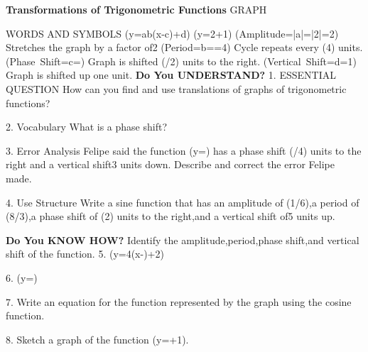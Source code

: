 \documentclass{article}
\newenvironment{concept-summary}{}{}    %
\newcommand{\answer}[1]{}               %
\newcommand{\placeholder}[2]{}          %
\begin{document}
\begin{concept-summary}
\textbf{Transformations of Trigonometric Functions}
GRAPH
\placeholder{graph}{Red y=sin x and blue y=2sin[(1/2)(x-pi/2)]+1,arrowed x,y axes,O; x ticks pi/2,labels-2pi,-pi,pi,2pi; y ticks1,labels-2,2,window-3pi..3pi,-4..4. Blue maxima(-5pi/2,3),(3pi/2,3),minimum(-pi/2,-1), red amplitude1 period2pi;curves end arrows,equation labels colored.}
WORDS AND SYMBOLS
(y=a\sin b(x-c)+d)
(y=2+1)
(Amplitude=|a|=|2|=2)
Stretches the graph by a factor of2
(Period=\frac{2\pi}b==4\pi)
Cycle repeats every (4\pi) units.
(Phase\ Shift=c=\frac{})
Graph is shifted (\pi/2) units to the right.
(Vertical\ Shift=d=1)
Graph is shifted up one unit.
\textbf{Do You UNDERSTAND?}
1. ESSENTIAL QUESTION How can you find and use translations of graphs of trigonometric functions?
\answer{You can analyze the graphs of sine and cosine functions to find changes in amplitude,period,phase shift,and vertical shift.}
2. Vocabulary What is a phase shift?
\answer{A phase shift is a horizontal translation of a periodic function.}
3. Error Analysis Felipe said the function (y=) has a phase shift (\pi/4) units to the right and a vertical shift3 units down. Describe and correct the error Felipe made.
\answer{The value of c in the function is negative,which means the phase shift is to the left,not to the right. The phase shift is left(pi/4) units.}
4. Use Structure Write a sine function that has an amplitude of (1/6),a period of (8\pi/3),a phase shift of (2\pi) units to the right,and a vertical shift of5 units up.
\answer{(y=\frac16\sin[\frac34(x-2\pi)]+5)}
\textbf{Do You KNOW HOW?}
Identify the amplitude,period,phase shift,and vertical shift of the function.
5. (y=4\sin(x-\frac{})+2)
\answer{amplitude:4;period:(2\pi);phase shift:right(pi/6) units;vertical shift:up2 units}
6. (y=)
\answer{amplitude:(1/3);period:(\pi);phase shift:left(pi/2) units;vertical shift:down1 unit}
7. Write an equation for the function represented by the graph using the cosine function.
\placeholder{graph}{Red sinusoid,arrowed x,y axes,O; x ticks pi/2 labels-2pi,-pi,pi,2pi; y ticks1/2 labels-1,-2,window-3pi..3pi,-3..1. Red labeled points(-pi/2,1),(0,-1),(pi/2,-3); maxima-5pi/2,-pi/2,3pi/2,y1;troughs-3pi/2,pi/2,5pi/2,y-3;arrows.}
\answer{(y=2\cos(x+\frac\pi2)-1)}
8. Sketch a graph of the function (y=\sin[2(x+\frac\pi2)]+1).
\answer{Graph shown.}
\placeholder{graph}{Red-sin2x+1,arrowed x,y axes,O; x ticks pi/2 labels-pi,pi; y ticks1/2 labels-2,-1,1,2;window-2pi..2pi,-5/2..5/2. Maxima(-pi/4+kpi,2), minima(pi/4+kpi,0),yintercept1,end arrows.}
\end{concept-summary}
\end{document}
